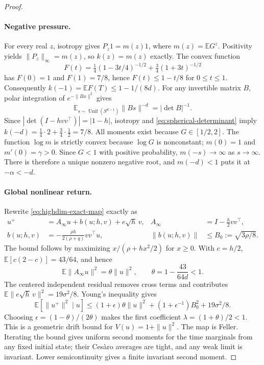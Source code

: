 \begin{proof}
\paragraph{Negative pressure.}
For every real $z$, isotropy gives $P_z1=m(z)1$, where
$m(z)=\mathbb EG^z$. Positivity yields
$\|P_z\|_\infty=m(z)$, so $k(z)=m(z)$ exactly.
The convex function
\[
 F(t)=\tfrac14(1-3t/4)^{-1/2}
      +\tfrac34(1+3t)^{-1/2}
\]
has $F(0)=1$ and $F(1)=7/8$, hence
$F(t)\le1-t/8$ for $0\le t\le1$.
Consequently $k(-1)=\mathbb EF(T)\le1-1/(8d)$.
For any invertible matrix $B$, polar integration of
$e^{-\|Bx\|^2}$ gives
\begin{equation}
 \mathbb E_{s\sim\operatorname{Unif}(S^{d-1})}\|Bs\|^{-d}
       =|\det B|^{-1}.
 \label{eq:spherical-determinant}
\end{equation}
Since $|\det(I-hvv^\top)|=|1-h|$, isotropy and
\eqref{eq:spherical-determinant} imply
$k(-d)=\tfrac14\cdot2+\tfrac34\cdot\tfrac12=7/8$.
All moments exist because $G\in[1/2,2]$.
The function $\log m$ is strictly convex because $\log G$ is
nonconstant; $m(0)=1$ and $m'(0)=\gamma>0$.
Since $G<1$ with positive probability, $m(-s)\to\infty$ as
$s\to\infty$. There is therefore a unique nonzero negative root, and
$m(-d)<1$ puts it at $-\alpha<-d$.

\paragraph{Global nonlinear return.}
Rewrite \eqref{eq:highdim-exact-map} exactly as
\begin{align}
 u^+&=A_\infty u+b(u;h,v)+e\sqrt h\,v,
 &A_\infty&=I-\tfrac h2vv^\top,\\
 b(u;h,v)&=-\frac{\rho h}{2(\rho+q)}vv^\top u,
 &\|b(u;h,v)\|&\le B_0:=\sqrt{3\rho/8}.
 \label{eq:highdim-bounded-remainder}
\end{align}
The bound follows by maximizing $x/(\rho+hx^2/2)$ for $x\ge0$.
With $c=h/2$, $\mathbb E[c(2-c)]=43/64$, and hence
\[
 \mathbb E\|A_\infty u\|^2
   =\theta\|u\|^2,
 \qquad \theta=1-\frac{43}{64d}<1.
\]
The centered independent residual removes cross terms and contributes
$\mathbb E\|e\sqrt h\,v\|^2=19\sigma^2/8$. Young's inequality gives
\[
 \mathbb E[\|u^+\|^2\mid u]
 \le(1+\epsilon)\theta\|u\|^2
     +(1+\epsilon^{-1})B_0^2+19\sigma^2/8.
\]
Choosing $\epsilon=(1-\theta)/(2\theta)$ makes the first coefficient
$\lambda=(1+\theta)/2<1$. This is a geometric drift bound for
$V(u)=1+\|u\|^2$. The map is Feller. Iterating the bound gives uniform
second moments for the time marginals from any fixed initial state;
their Ces\`aro averages are tight, and any weak limit is invariant.
Lower semicontinuity gives a finite invariant second moment.


\end{proof}
